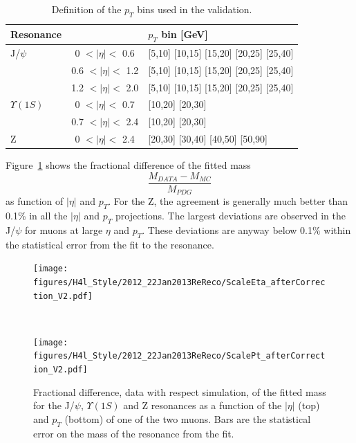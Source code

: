 \begin{table}[hbH]
\begin{center}
\caption{Definition of the $p_T$ bins used in the validation.\label{tab:pt_bins}}
\begin{tabular}{|l|cl|}
\hline
Resonance & & $p_T$ bin [GeV] \\
\hline
J/$\psi$      & 0   $<|\eta|<$ 0.6 & [5,10] [10,15] [15,20] [20,25] [25,40] \\
              & 0.6 $<|\eta|<$ 1.2 & [5,10] [10,15] [15,20] [20,25] [25,40] \\
              & 1.2 $<|\eta|<$ 2.0 & [5,10] [10,15] [15,20] [20,25] [25,40] \\
\hline                     
$\Upsilon(1S)$& 0   $<|\eta|<$ 0.7 & [10,20] [20,30] \\
              & 0.7 $<|\eta|<$ 2.4 & [10,20] [20,30] \\
\hline                     
Z             & 0   $<|\eta|<$ 2.4 & [20,30] [30,40] [40,50] [50,90] \\
\hline
\end{tabular}
\end{center}
\end{table}

Figure~\ref{fig:ScaleDATAMC_8TeV} shows the fractional difference of the fitted mass
\[
\frac{M_{DATA}-M_{MC}}{M_{PDG}}
\]
as function of $|\eta|$ and  $p_T$. For the Z, the agreement is
generally much better than 0.1\% in all the $|\eta|$ and $p_T$ projections.
The largest deviations are observed in the J/$\psi$ for muons at large
$\eta$ and $p_T$. These deviations are anyway below 0.1\% within the
statistical error from the fit to the resonance.
\begin{figure}[hbtp]  
\begin{center}
\texttt{[image: figures/H4l\_Style/2012\_22Jan2013ReReco/ScaleEta\_afterCorrection\_V2.pdf]}
 \end{center}\\
\begin{center}
\texttt{[image: figures/H4l\_Style/2012\_22Jan2013ReReco/ScalePt\_afterCorrection\_V2.pdf]} 
 \end{center}
 \hspace{1cm} 
   \caption{Fractional difference, data with respect simulation, of the fitted mass for the J/$\psi$,
     $\Upsilon(1S)$ and Z resonances as a function of the $|\eta|$ (top)
     and $p_T$ (bottom) of one of the two muons. Bars are the
     statistical error on the mass of the resonance from the fit.
   \label{fig:ScaleDATAMC_8TeV}}
\end{figure} 

